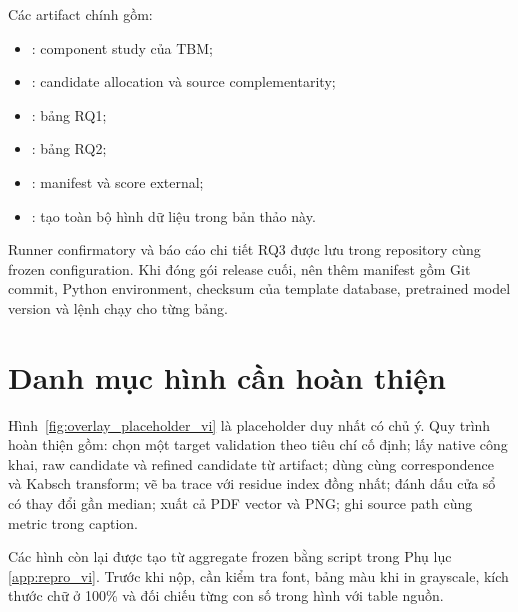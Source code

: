 \documentclass[12pt,a4paper,oneside]{report}
\begin{document}
Các artifact chính gồm:
\begin{itemize}
  \item {}: component study của TBM;
  \item {}: candidate allocation và source complementarity;
  \item {}: bảng RQ1;
  \item {}: bảng RQ2;
  \item {}: manifest và score external;
  \item {}: tạo toàn bộ hình dữ liệu trong bản thảo này.
\end{itemize}

Runner confirmatory và báo cáo chi tiết RQ3 được lưu trong repository cùng frozen
configuration. Khi đóng gói release cuối, nên thêm manifest gồm Git commit, Python
environment, checksum của template database, pretrained model version và lệnh chạy cho
từng bảng.

\chapter{Danh mục hình cần hoàn thiện}

Hình~\ref{fig:overlay_placeholder_vi} là placeholder duy nhất có chủ ý. Quy trình hoàn
thiện gồm: chọn một target validation theo tiêu chí cố định; lấy native công khai, raw
candidate và refined candidate từ artifact; dùng cùng correspondence và Kabsch transform;
vẽ ba trace với residue index đồng nhất; đánh dấu cửa sổ có thay đổi gần median; xuất cả
PDF vector và PNG; ghi source path cùng metric trong caption.

Các hình còn lại được tạo từ aggregate frozen bằng script trong Phụ lục
\ref{app:repro_vi}. Trước khi nộp, cần kiểm tra font, bảng màu khi in grayscale, kích
thước chữ ở 100\% và đối chiếu từng con số trong hình với table nguồn.


\end{document}

